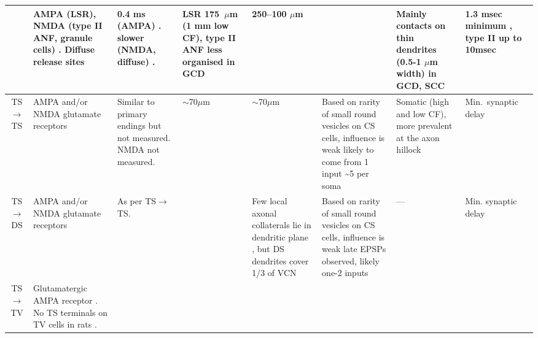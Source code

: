 \begin{longtable}{cYYYYYYY}
& %
AMPA (LSR), NMDA (type II ANF, granule cells)
\citep{Cant:1992,FerragamoGoldingEtAl:1998a,RyugoWrightEtAl:1993,Ryugo:1992,RyugoParks:2003}.
Diffuse release sites \citep{HurdHutsonEtAl:1999}             
& %
0.4 ms (AMPA)   \citep{GardnerTrussellEtAl:1999}. 
slower (NMDA, diffuse) \citep{HurdHutsonEtAl:1999}.    
& %
LSR 175~$\mu$m (1 mm low CF)\citep{Ryugo:2008}, type II ANF less organised in GCD \citep{WeedmanPongstapornEtAl:1996,RyugoWrigthEtAl:1993}
& %
250--100 $\mu$m \citep{FerragamoGoldingEtAl:1998a}                     
&                                            
& %
Mainly contacts on thin dendrites (0.5-1 $\mu$m width) in GCD, SCC 
\citep{BensonBrown:2004,FerragamoGoldingEtAl:1998}                
& %
1.3 msec minimum \citep{FerragamoGoldingEtAl:1998a}, 
type II up to 10msec \citep[theoretical][]{Brown:1993}
\\ \midrule
TS\ensuremath{\rightarrow}TS                        
& %
AMPA and/or NMDA glutamate receptors \citep{FerragamoGoldingEtAl:1998a}        
& %
Similar to primary endings but not measured.  
NMDA not measured.           
&
$\sim$70$\mu$m \citep[cat][]{SmithRhode:1989} 
& %
$\sim$70$\mu$m \citep[cat][]{SmithRhode:1989} 
& %
Based on rarity of small round vesicles on CS cells, influence is weak \citep{SmithRhode:1989} 
likely to come from 1 input \citep{FerragamoGoldingEtAl:1998a}                     
\~{}5 per soma  \citep[chinchilla][]{JosephsonMorest:1998}
& %
Somatic (high and low CF), more prevalent at the axon hillock   \citep[chinchilla][]{JosephsonMorest:1998}
& %
Min.\ synaptic delay 
\\ \midrule
TS\ensuremath{\rightarrow}DS                        
& %
AMPA and/or NMDA glutamate receptors \citep{FerragamoGoldingEtAl:1998a}  
& As per TS\ensuremath{\rightarrow}TS.
& %
& %
Few local axonal collaterals lie in dendritic plane \citep{SmithRhode:1989}, but DS dendrites cover 1/3 of VCN
& 
Based on rarity of small round vesicles on CS cells, influence is weak \citep{SmithRhode:1989} late EPSPs observed,
likely one-2 inputs \citep{FerragamoGoldingEtAl:1998a, OertelWuEtAl:1990} 
& ---                                     
& Min. synaptic delay \\ \midrule
TS\ensuremath{\rightarrow}TV                        
& %
Glutamatergic AMPA receptor  \citep{DoucetRossEtAl:1999,FerragamoGoldingEtAl:1998a,ZhangOertel:1993}.
No TS terminals on TV cells in rats \citep[rat][]{RubioJuiz:2004}.

\end{longtable}
